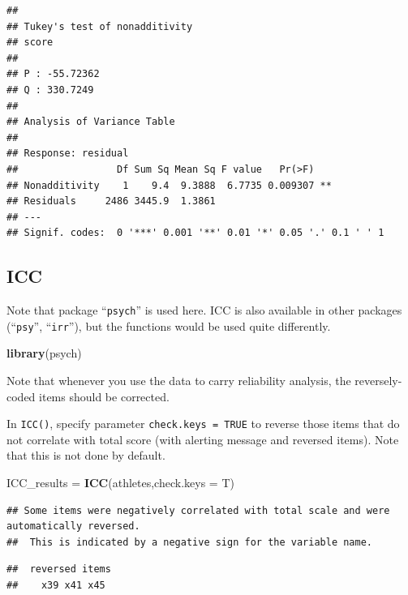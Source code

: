 \documentclass[
]{ctexart}
\newenvironment{Shaded}{\begin{snugshade}}{\end{snugshade}}
\newcommand{\AttributeTok}[1]{\textcolor[rgb]{0.13,0.29,0.53}{#1}}
\newcommand{\FunctionTok}[1]{\textcolor[rgb]{0.13,0.29,0.53}{\textbf{#1}}}
\newcommand{\NormalTok}[1]{#1}
\newcommand{\OtherTok}[1]{\textcolor[rgb]{0.56,0.35,0.01}{#1}}
\begin{document}
\begin{verbatim}
## 
## Tukey's test of nonadditivity
## score 
## 
## P : -55.72362
## Q : 330.7249 
## 
## Analysis of Variance Table
## 
## Response: residual
##                 Df Sum Sq Mean Sq F value   Pr(>F)   
## Nonadditivity    1    9.4  9.3888  6.7735 0.009307 **
## Residuals     2486 3445.9  1.3861                    
## ---
## Signif. codes:  0 '***' 0.001 '**' 0.01 '*' 0.05 '.' 0.1 ' ' 1
\end{verbatim}

\hypertarget{icc}{%
\subsection{ICC}\label{icc}}

Note that package ``\texttt{psych}'' is used here. ICC is also available
in other packages (``\texttt{psy}'', ``\texttt{irr}''), but the
functions would be used quite differently.

\begin{Shaded}
\begin{Highlighting}[]
\FunctionTok{library}\NormalTok{(psych)}
\end{Highlighting}
\end{Shaded}

Note that whenever you use the data to carry reliability analysis, the
reversely-coded items should be corrected.

In \texttt{ICC()}, specify parameter \texttt{check.keys\ =\ TRUE} to
reverse those items that do not correlate with total score (with
alerting message and reversed items). Note that this is not done by
default.

\begin{Shaded}
\begin{Highlighting}[]
\NormalTok{ICC\_results }\OtherTok{=} \FunctionTok{ICC}\NormalTok{(athletes,}\AttributeTok{check.keys =}\NormalTok{ T)}
\end{Highlighting}
\end{Shaded}

\begin{verbatim}
## Some items were negatively correlated with total scale and were automatically reversed.
##  This is indicated by a negative sign for the variable name.
\end{verbatim}

\begin{verbatim}
##  reversed items
##    x39 x41 x45
\end{verbatim}
\end{document}

